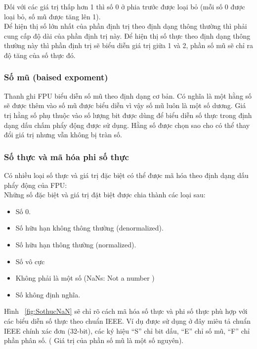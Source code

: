 		Đối với các giá trị thấp hơn 1 thì số 0 ở phia trước được loại bỏ (mỗi số 0 được loại bỏ, số mũ được tăng lên 1).\\

		Để hiện thị số lớn nhất của phần định trị theo định dạng thông thường thì phải cung cấp độ dài của phần định trị này. Để hiện thị số thực theo định dạng thông thường này thì phần định trị sẽ biểu diễn giá trị giữa 1 và 2, phần số mũ sẽ chỉ ra độ tăng của số thực đó.
		
		\subsubsection*{Số mũ (baised expoment)}
			Thanh ghi FPU biểu diễn số mũ theo định dạng cơ bản. Có nghĩa là một hằng số sẽ được thêm vào số mũ được biểu diễn vì vậy số mũ luôn là một số dương. Giá trị hằng số phụ thuộc vào số lượng bit được dùng để biểu diễn số thực trong định dạng dấu chấm phẩy động được sử dụng. Hằng số được chọn sao cho có thể thay đổi giá trị nhưng vẫn không bị tràn số.
			
			\subsubsection*{Số thực và mã hóa phi số thực}
			Có nhiều loại số thực và giá trị đặc biệt có thể được mã hóa theo định dạng dấu phẩy động của FPU:\\
			
			Những số đặc biệt và giá trị đặt biệt được chia thành các loại sau:
			\begin{itemize}
				\renewcommand{\labelitemi}{\textbullet}	
				\item Số 0.
				\item	Số hữu hạn không thông thường (denormalized).
				\item	Số hữu hạn thông thường (normalized).
				\item	Số vô cực
				\item	Không phải là một số (NaNs: Not a number )
				\item	Số không định nghĩa.
			\end{itemize}
			
			Hình ~\ref{fig:SothucNaN} sẽ chỉ rõ cách mã hóa số thực và phi số thực phù hợp với các biểu diễn số thực theo chuẩn IEEE. Ví dụ được sử dụng ở đây miêu tả chuẩn IEEE chính xác đơn (32-bit), các ký hiệu “S” chỉ bit dấu, “E” chỉ số mũ, “F” chỉ phần phân số. ( Giá trị của phần số mũ là một số nguyên). \\

